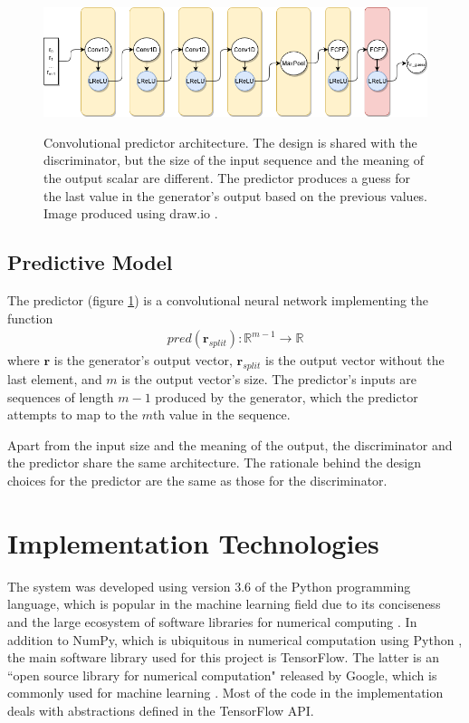 \documentclass[12pt, titlepage]{report}
\theoremstyle{definition}
\begin{document}
\begin{figure}
\centering
\includegraphics[width=1\textwidth]{img/predictor.png}\\
\caption[Predictor architecture]{Convolutional predictor architecture. The design is shared with the discriminator, but the size of the input sequence and the meaning of the output scalar are different. The predictor produces a guess for the last value in the generator's output based on the previous values. Image produced using draw.io \cite{jgraph2018draw}.}
\label{figure:architecture_predictor}
\end{figure}


\subsection{Predictive Model}
The predictor (figure \ref{figure:architecture_predictor}) is a convolutional neural network implementing the function
\begin{gather}
pred(\bm{r}_{split}) : \mathbb{R}^{m - 1} \rightarrow \mathbb{R}
\end{gather}
where $\bm{r}$ is the generator's output vector, $\bm{r}_{split}$ is the output vector without the last element, and $m$ is the output vector's size. The predictor's inputs are sequences of length $m-1$ produced by the generator, which the predictor attempts to map to the $m$th value in the sequence.

Apart from the input size and the meaning of the output, the discriminator and the predictor share the same architecture. The rationale behind the design choices for the predictor are the same as those for the discriminator.


\section{Implementation Technologies}
The system was developed using version 3.6 of the Python programming language, which is popular in the machine learning field due to its conciseness and the large ecosystem of software libraries for numerical computing \cite{numpy}. In addition to NumPy, which is ubiquitous in numerical computation using Python \cite{numpy}, the main software library used for this project is TensorFlow. The latter is an ``open source library for numerical computation" released by Google, which is commonly used for machine learning \cite{tensorflow}. Most of the code in the implementation deals with abstractions defined in the TensorFlow API.
\end{document}
